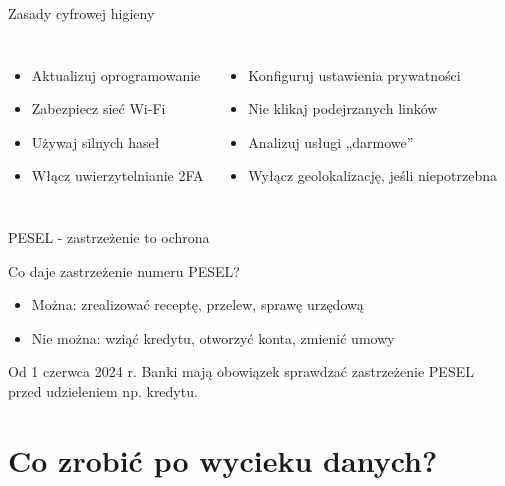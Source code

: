 \begin{frame}{Zasady cyfrowej higieny}
\begin{columns}[c]
    \begin{itemize}
        \item Aktualizuj oprogramowanie
        \item Zabezpiecz sieć Wi-Fi
        \item Używaj silnych haseł
        \item Włącz uwierzytelnianie 2FA
    \end{itemize}
    \begin{itemize}
        \item Konfiguruj ustawienia prywatności
        \item Nie klikaj podejrzanych linków
        \item Analizuj usługi „darmowe”
        \item Wyłącz geolokalizację, jeśli niepotrzebna \cite{PROTECTION}
    \end{itemize}
\end{columns}
\end{frame}

\begin{frame}{PESEL - zastrzeżenie to ochrona}
\begin{block}{Co daje zastrzeżenie numeru PESEL?}
\begin{itemize}
    \item Można: zrealizować receptę, przelew, sprawę urzędową
    \item Nie można: wziąć kredytu, otworzyć konta, zmienić umowy
\end{itemize}
\end{block}
\pause
\begin{exampleblock}{Od 1 czerwca 2024 r.}
Banki mają obowiązek sprawdzać zastrzeżenie PESEL przed udzieleniem np. kredytu. \cite{pesel}
\end{exampleblock}
\end{frame}

\section{Co zrobić po wycieku danych?}

